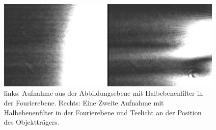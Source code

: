 \begin{figure}
\centering
\includegraphics[width=0.7\linewidth]{images/edit-xcf/example22_Halbebenenfilter_mit_und_ohne_Teelicht}
\caption{links: Aufnahme aus der Abbildungsebene mit Halbebenenfilter in der Fourierebene. Rechts: Eine Zweite Aufnahme mit Halbebenenfilter in der Fourierebene und Teelicht an der Position des Objektträgers.}
\label{fig:example22_Halbebenenfilter_mit_und_ohne_Teelicht}
\end{figure}



